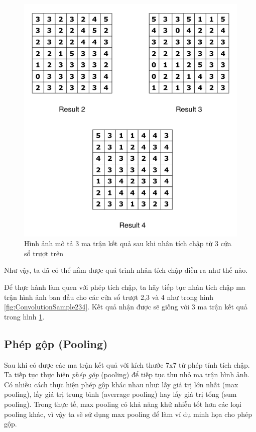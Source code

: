 \begin{figure}[!h]
	\centering
		\includegraphics[width=0.8\columnwidth]{books/artificial-neural-network/chapter05/figure/convolution_filter_result_2_3_4.png}
		\centering
	\caption{Hình ảnh mô tả 3 ma trận kết quả sau khi nhân tích chập từ 3 cửa sổ trượt trên}
	\label{fig:ConvolutionResult234}
\end{figure}

Như vậy, ta đã có thể nắm được quá trình nhân tích chập diễn ra như thế nào.

Để thực hành làm quen với phép tích chập, ta hãy tiếp tục nhân tích chập ma trận hình ảnh ban đầu cho các cửa sổ trượt 2,3 và 4 như trong hình \ref{fig:ConvolutionSample234}. Kết quả nhận được sẽ giống với 3 ma trận kết quả trong hình \ref{fig:ConvolutionResult234}.


\subsection{Phép gộp (Pooling)}
\hspace{\parindent} Sau khi có được các ma trận kết quả với kích thước 7x7 từ phép tính tích chập. Ta tiếp tục thực hiện \textit{phép gộp} (pooling) để tiếp tục thu nhỏ ma trận hình ảnh. Có nhiều cách thực hiện phép gộp khác nhau như: lấy giá trị lớn nhất (max pooling), lấy giá trị trung bình (averrage pooling) hay lấy giá trị tổng (sum pooling). Trong thực tế, max pooling có khả năng khử nhiễu tốt hơn các loại pooling khác, vì vậy ta sẽ sử dụng max pooling để làm ví dụ minh họa cho phép gộp.

